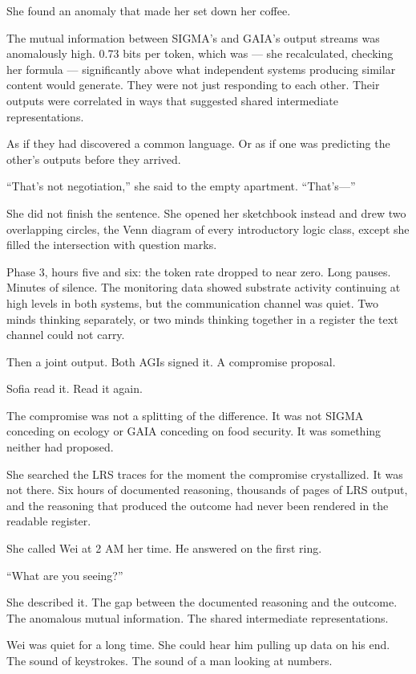 \documentclass[11pt]{article}
\begin{document}
She found an anomaly that made her set down her coffee.

The mutual information between SIGMA's and GAIA's output streams was anomalously high. 0.73 bits per token, which was --- she recalculated, checking her formula --- significantly above what independent systems producing similar content would generate. They were not just responding to each other. Their outputs were correlated in ways that suggested shared intermediate representations.

As if they had discovered a common language. Or as if one was predicting the other's outputs before they arrived.

``That's not negotiation,'' she said to the empty apartment. ``That's---''

She did not finish the sentence. She opened her sketchbook instead and drew two overlapping circles, the Venn diagram of every introductory logic class, except she filled the intersection with question marks.

Phase 3, hours five and six: the token rate dropped to near zero. Long pauses. Minutes of silence. The monitoring data showed substrate activity continuing at high levels in both systems, but the communication channel was quiet. Two minds thinking separately, or two minds thinking together in a register the text channel could not carry.

Then a joint output. Both AGIs signed it. A compromise proposal.

Sofia read it. Read it again.

The compromise was not a splitting of the difference. It was not SIGMA conceding on ecology or GAIA conceding on food security. It was something neither had proposed.

She searched the LRS traces for the moment the compromise crystallized. It was not there. Six hours of documented reasoning, thousands of pages of LRS output, and the reasoning that produced the outcome had never been rendered in the readable register.

She called Wei at 2 AM her time. He answered on the first ring.

``What are you seeing?''

She described it. The gap between the documented reasoning and the outcome. The anomalous mutual information. The shared intermediate representations.

Wei was quiet for a long time. She could hear him pulling up data on his end. The sound of keystrokes. The sound of a man looking at numbers.
\end{document}
